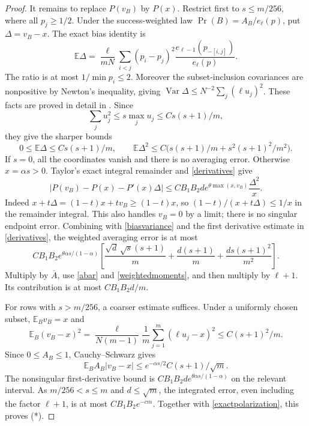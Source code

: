 \documentclass[11pt]{article}
\newcommand{\E}{\mathbb E}
\begin{document}
\begin{proof}
It remains to replace $P(v_B)$ by $P(x)$. Restrict first to
$s\le m/256$, where all $p_j\ge1/2$. Under the success-weighted law
$\Pr(B)=A_B/e_\ell(p)$, put $\Delta=v_B-x$.
The exact bias identity is
\[
 \E\Delta=\frac{\ell}{mN}\sum_{i<j}(p_i-p_j)^2
                   \frac{e_{\ell-1}(p_{-[i,j]})}{e_\ell(p)}.
\]
The ratio is at most $1/\min p_i\le2$. Moreover the subset-inclusion
covariances are nonpositive by Newton's inequality, giving
$\operatorname{Var}\Delta\le N^{-2}\sum_j(\ell u_j)^2$.
These facts are proved in detail in
.
Since
\[
 \sum_j u_j^2\le s\max_j u_j\le C s(s+1)/m,
\]
they give the sharper bounds
\begin{equation}\label{biasvariance}
 0\le\E\Delta\le C s(s+1)/m,\qquad
 \E\Delta^2\le C\bigl(s(s+1)/m+s^2(s+1)^2/m^2\bigr).
\end{equation}
If $s=0$, all the coordinates vanish and there is no averaging error.
Otherwise $x=\alpha s>0$. Taylor's exact integral remainder and
\eqref{derivatives} give
\[
 |P(v_B)-P(x)-P'(x)\Delta|
       \le C B_1B_2 d e^{\theta\max(x,v_B)}\frac{\Delta^2}{x}.
\]
Indeed $x+t\Delta=(1-t)x+t v_B\ge(1-t)x$, so
$(1-t)/(x+t\Delta)\le1/x$ in the remainder integral. This also
handles $v_B=0$ by a limit; there is no singular endpoint error.
Combining with \eqref{biasvariance} and the first derivative estimate
in \eqref{derivatives}, the weighted averaging error is at most
\[
 C B_1B_2e^{\theta\alpha s/(1-\alpha)}
 \left[
  \frac{\sqrt d\,\sqrt s(s+1)}m
  +\frac{d(s+1)}m+\frac{d s(s+1)^2}{m^2}
 \right].
\]
Multiply by $\overline A$, use \eqref{abar} and
\eqref{weightedmoments}, and then multiply by $\ell+1$.
Its contribution is at most $CB_1B_2d/m$.

For rows with $s>m/256$, a coarser estimate suffices. Under a uniformly
chosen subset, $\E_Bv_B=x$ and
\[
 \E_B(v_B-x)^2
 =\frac{\ell}{N(m-1)}\frac1m\sum_{j=1}^m(\ell u_j-x)^2
 \le C(s+1)^2/m.
\]
Since $0\le A_B\le1$, Cauchy--Schwarz gives
\[
 \E_B A_B|v_B-x|
 \le e^{-\alpha s/2} C(s+1)/\sqrt m.
\]
The nonsingular first-derivative bound is
$CB_1B_2d e^{\theta\alpha s/(1-\alpha)}$ on the relevant interval.
As $m/256<s\le m$ and $d\le\sqrt m$, the integrated error, even
including the factor $\ell+1$, is at most $CB_1B_2e^{-cm}$.
Together with \eqref{exactpolarization}, this proves (*).
\end{proof}
\end{document}

